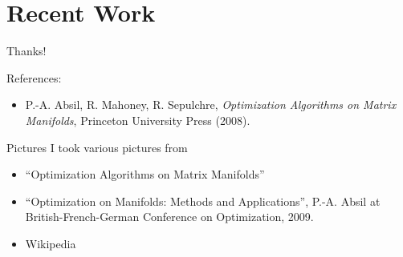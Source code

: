 \documentclass[xcolor=dvipsnames,t]{beamer} %
\begin{document}
\section{Recent Work}
\begin{frame}
\end{frame}



\begin{frame}{Thanks!}
    
   
   References:
   \begin{itemize}
      \item P.-A. Absil, R. Mahoney, R. Sepulchre, \emph{Optimization Algorithms on Matrix Manifolds}, Princeton University Press (2008).
   \end{itemize}
\end{frame}



\begin{frame}{Pictures}
   I took various pictures from
   
   \begin{itemize}
      \item ``Optimization Algorithms on Matrix Manifolds''
      \item ``Optimization on Manifolds: Methods and Applications'', P.-A. Absil at British-French-German Conference on Optimization, 2009.
      \item Wikipedia
   \end{itemize}

\end{frame}
\end{document}

